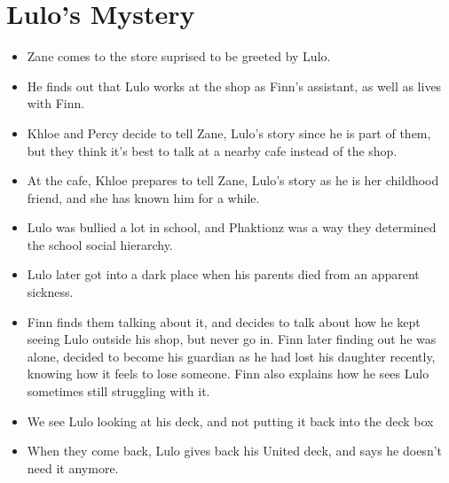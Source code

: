 \section{Lulo's Mystery}

\begin{itemize}
    \item Zane comes to the store suprised to be greeted by Lulo.
    \item He finds out that Lulo works at the shop as Finn’s assistant, as well as lives with Finn.
    \item Khloe and Percy decide to tell Zane, Lulo’s story since he is part of them, but they think it’s best to talk at a nearby cafe instead of the shop.
    \item At the cafe, Khloe prepares to tell Zane, Lulo’s story as he is her childhood friend, and she has known him for a while.
    \item Lulo was bullied a lot in school, and Phaktionz was a way they determined the school social hierarchy.
    \item Lulo later got into a dark place when his parents died from an apparent sickness.
    \item Finn finds them talking about it, and decides to talk about how he kept seeing Lulo outside his shop, but never go in. Finn later finding out he 
    was alone, decided to become his guardian as he had lost his daughter recently, knowing how it feels to lose someone. Finn also explains how he sees Lulo 
    sometimes still struggling with it.
    \item We see Lulo looking at his deck, and not putting it back into the deck box
    \item When they come back, Lulo gives back his United deck, and says he doesn’t need it anymore.
\end{itemize}